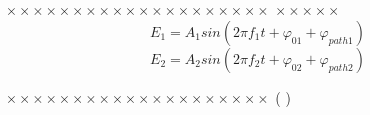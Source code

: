 \documentclass{article}
\begin{document}
\subsection{ }
\subsection{ }
\subsubsection{ }
\paragraph{ }
\paragraph{ }
\paragraph{ }

\sectionbreak
\section{ }

\sectionbreak
\section{ }


\sectionbreak
\section{ }
\hspace{12em}\hongzifuzhu{ }

$ \times\times\times\times\times\times\times\times\times\times\times\times\times\times\times\times\times\times\times\times $  $ \times\times\times\times\times$  
\begin{equation}
	E_{1}=A_{1}sin\!\left(2\pi f_{1}t+\varphi_{01}+\varphi_{path1} \right)
\end{equation}
\begin{equation}
	E_{2}=A_{2}sin\!\left(2\pi f_{2}t+\varphi_{02}+\varphi_{path2} \right)
\end{equation}

$ \times\times\times\times\times\times\times\times\times\times\times\times\times\times\times\times\times\times\times\times $  (   )
\end{document}
